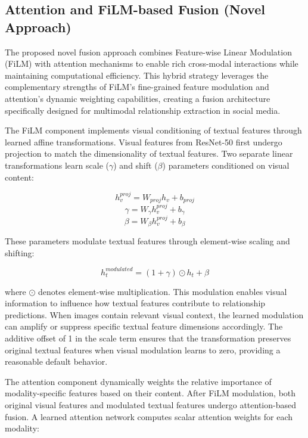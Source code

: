 \documentclass[12pt,a4paper]{report}
\begin{document}
\subsection{Attention and FiLM-based Fusion (Novel Approach)}

The proposed novel fusion approach combines Feature-wise Linear Modulation (FiLM) with attention mechanisms to enable rich cross-modal interactions while maintaining computational efficiency. This hybrid strategy leverages the complementary strengths of FiLM's fine-grained feature modulation and attention's dynamic weighting capabilities, creating a fusion architecture specifically designed for multimodal relationship extraction in social media.

The FiLM component implements visual conditioning of textual features through learned affine transformations. Visual features from ResNet-50 first undergo projection to match the dimensionality of textual features. Two separate linear transformations learn scale ($\gamma$) and shift ($\beta$) parameters conditioned on visual content:

\begin{equation}
h_v^{proj} = W_{proj} h_v + b_{proj}
\end{equation}
\begin{equation}
\gamma = W_{\gamma} h_v^{proj} + b_{\gamma}
\end{equation}
\begin{equation}
\beta = W_{\beta} h_v^{proj} + b_{\beta}
\end{equation}

These parameters modulate textual features through element-wise scaling and shifting:

\begin{equation}
h_t^{modulated} = (1 + \gamma) \odot h_t + \beta
\end{equation}

where $\odot$ denotes element-wise multiplication. This modulation enables visual information to influence how textual features contribute to relationship predictions. When images contain relevant visual context, the learned modulation can amplify or suppress specific textual feature dimensions accordingly. The additive offset of 1 in the scale term ensures that the transformation preserves original textual features when visual modulation learns to zero, providing a reasonable default behavior.

The attention component dynamically weights the relative importance of modality-specific features based on their content. After FiLM modulation, both original visual features and modulated textual features undergo attention-based fusion. A learned attention network computes scalar attention weights for each modality:
\end{document}

